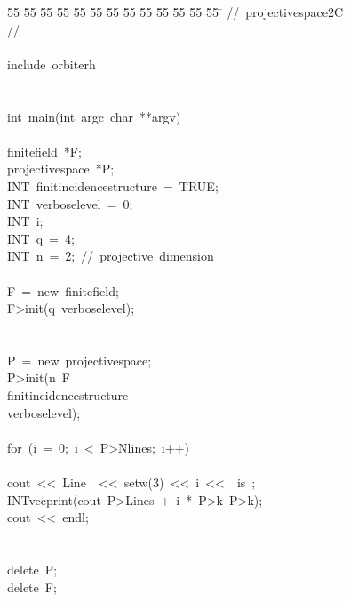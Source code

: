 %
%
\begin{tabbing}
55 \= 55 \= 55 \= 55 \= 55 \= 55 \= 55 \= 55 \= 55 \= 55 \= 55 \= 55 \= 55 \= \kill
//\ projectivespace2C\\[0pt]
//\ \\[0pt]
\\[0pt]
include\ orbiterh\\[0pt]
\\[0pt]
\\[0pt]
int\ main(int\ argc\ char\ **argv)\\[0pt]
\\[0pt]
\>finitefield\ *F;\\[0pt]
\>projectivespace\ *P;\\[0pt]
\>INT\ finitincidencestructure\ =\ TRUE;\\[0pt]
\>INT\ verboselevel\ =\ 0;\\[0pt]
\>INT\ i;\\[0pt]
\>INT\ q\ =\ 4;\\[0pt]
\>INT\ n\ =\ 2;\ //\ projective\ dimension\\[0pt]
\\[0pt]
\>F\ =\ new\ finitefield;\\[0pt]
\>F>init(q\ verboselevel);\\[0pt]
\\[0pt]
\\[0pt]
\>P\ =\ new\ projectivespace;\\[0pt]
\>P>init(n\ F\ \\[0pt]
\>\>finitincidencestructure\ \\[0pt]
\>\>verboselevel);\\[0pt]
\\[0pt]
\>for\ (i\ =\ 0;\ i\ <\ P>Nlines;\ i++)\ \\[0pt]
\\[0pt]
\>\>cout\ <<\ Line\ \ <<\ setw(3)\ <<\ i\ <<\ \ is\ ;\\[0pt]
\>\>INTvecprint(cout\ P>Lines\ +\ i\ *\ P>k\ P>k);\\[0pt]
\>\>cout\ <<\ endl;\\[0pt]
\>\>\\[0pt]
\\[0pt]
\>delete\ P;\\[0pt]
\>delete\ F;\\[0pt]
\\[0pt]
\\[0pt]
\\[0pt]
\end{tabbing}
